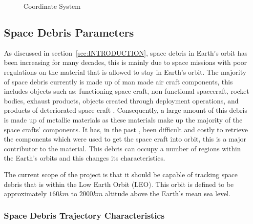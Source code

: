 \documentclass[11pt]{witseiepaper}
\begin{document}
\begin{figure}
\caption{Coordinate System}
\label{fig:CoordinateSystem}
\end{figure}


\subsection{Space Debris Parameters} \label{sec:SpaceDebrisParameters}
As discussed in section~\ref{sec:INTRODUCTION}, space debris in Earth's orbit has been increasing for many decades, this is mainly due to space missions with poor regulations on the material that is allowed to stay in Earth's orbit.
The majority of space debris currently is made up of man made air craft components, this includes objects such as: functioning space craft, non-functional spacecraft, rocket bodies, exhaust products, objects created through deployment operations, and products of deteriorated space craft \cite{OrbitalDebrisTechnicalAssessment}.
Consequently, a large amount of this debris is made up of metallic materials as these materials make up the majority of the space crafts' components.
It has, in the past \cite{Spacex}, been difficult and costly to retrieve the components which were used to get the space craft into orbit, this is a major contributor to the material.
This debris can occupy a number of regions within the Earth's orbits and this changes its characteristics.

The current scope of the project is that it should be capable of tracking space debris that is within the Low Earth Orbit (LEO). This orbit is defined to be approximately $160 km$ to $2000 km$ altitude above the Earth's mean sea level.


\subsubsection{Space Debris Trajectory Characteristics} \label{sec:SpaceDebrisTrajectoryCharacteristics}
\end{document}
